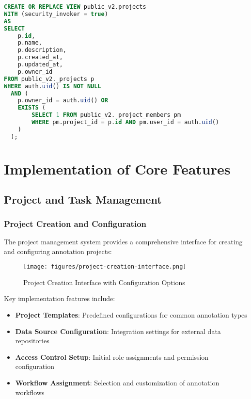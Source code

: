 \begin{lstlisting}[language=sql, caption=Example Secure View Definition]
CREATE OR REPLACE VIEW public_v2.projects
WITH (security_invoker = true)
AS
SELECT 
    p.id,
    p.name,
    p.description,
    p.created_at,
    p.updated_at,
    p.owner_id
FROM public_v2._projects p
WHERE auth.uid() IS NOT NULL
  AND (
    p.owner_id = auth.uid() OR
    EXISTS (
        SELECT 1 FROM public_v2._project_members pm 
        WHERE pm.project_id = p.id AND pm.user_id = auth.uid()
    )
  );
\end{lstlisting}

\section{Implementation of Core Features}
\label{sec:core-features}

\subsection{Project and Task Management}
\label{subsec:project-task-management}

\subsubsection{Project Creation and Configuration}

The project management system provides a comprehensive interface for creating and configuring annotation projects:

\begin{figure}[htbp]
\centering
\texttt{[image: figures/project-creation-interface.png]}
\caption{Project Creation Interface with Configuration Options}
\label{fig:project-creation}
\end{figure}

Key implementation features include:

\begin{itemize}
    \item \textbf{Project Templates}: Predefined configurations for common annotation types
    \item \textbf{Data Source Configuration}: Integration settings for external data repositories
    \item \textbf{Access Control Setup}: Initial role assignments and permission configuration
    \item \textbf{Workflow Assignment}: Selection and customization of annotation workflows
\end{itemize}


